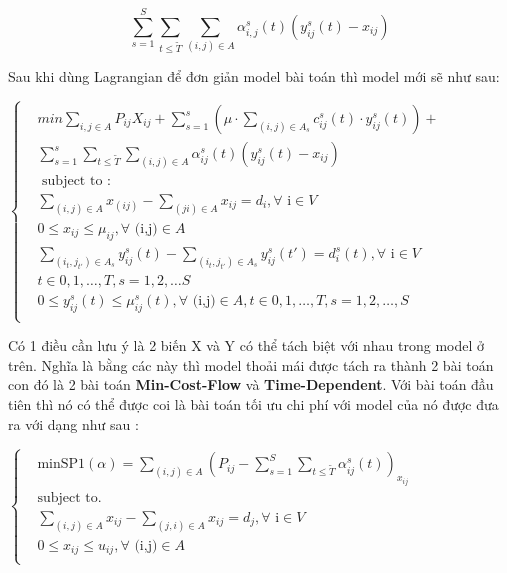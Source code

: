 \documentclass[a4paper]{article}
\begin{document}
\[\sum_{s=1}^S \sum _{t \leqslant \tilde{T}} \sum_{(i,j)\in A} \alpha _{i,j}^s (t)(y_{ij}^s (t) - x_{ij})  \]


Sau khi dùng Lagrangian để đơn giản model bài toán thì model mới sẽ như sau:

\begin{center}
$\begin{cases}
 &min \sum_{i,j \in A} P_{ij} X_{ij} + \sum_{s=1}^s( \mu \cdot \sum_{(i,j)\in A_s} c_{ij}^s(t) \cdot y_{ij}^s (t)) + \\
 &\sum_{s=1}^s \sum_{t \leqslant \tilde{T}} \sum_{(i,j) \in A} \alpha _{ij}^s (t) (y_{ij}^s (t) -x_{ij})\\
 & \text{ subject to :} \\
 & \sum_{(i,j) \in A} x_{(ij)} - \sum _{(ji)\in A} x_{ij} = d_i, \forall \text{ i}\in V\\
 & 0 \leqslant x_{ij} \leqslant \mu_{ij}, \forall \text{ (i,j)} \in A \\
 & \sum_{(i_t,j_{t'})\in A_s} y_{ij}^s (t) - \sum_{(i_t,j_{t'})\in A_s} y_{ij}^s (t') = d_i^s (t) , \forall \text{ i} \in V\\
 & t\in {0,1,\dots , T} , s= 1,2,\dots S \\
 & 0 \leqslant y_{ij}^s (t) \leqslant \mu_{ij} ^ s (t), \forall \text{ (i,j)} \in A, t \in {0,1,\dots, T}, s=1,2,\dots , S \\
\end{cases}$
\end{center}
 Có 1 điều cần lưu ý là 2 biến X và Y có thể tách biệt với nhau trong model ở trên. Nghĩa là bằng các này thì model thoải mái được tách ra thành 2 bài toán con đó là 2 bài toán \textbf{Min-Cost-Flow} và \textbf{Time-Dependent}. Với bài toán đầu tiên thì nó có thể được coi là bài toán tối ưu chi phí với model của nó được đưa ra với dạng như sau :
 \begin{center}
$ \begin{cases}
&\text{minSP1}( \alpha) = \sum_{(i,j)\in A} (P_{ij} - \sum_{s=1}^{S} \sum_{t \leqslant \tilde{T}} \alpha_{ij}^s (t))_{x_{ij}}\\
& \text{subject to.}\\
& \sum_{(i,j)\in A} x_{ij} - \sum_{(j,i) \in A} x_{ij} = d_j , \forall \text{ i} \in V \\
& 0 \leqslant x_{ij} \leqslant u_{ij}, \forall \text { (i,j)} \in A\\
\end{cases}$
\end{center}
\end{document}
